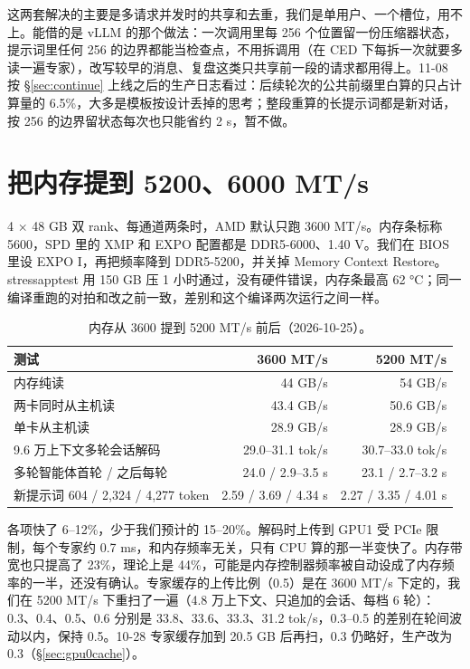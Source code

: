 \documentclass[11pt,a4paper]{article}
\newcommand{\tps}{tok/s}
\begin{document}
这两套解决的主要是多请求并发时的共享和去重，我们是单用户、一个槽位，用不上。能借的是 vLLM 的那个做法：一次调用里每 256 个位置留一份压缩器状态，提示词里任何 256 的边界都能当检查点，不用拆调用（在 CED 下每拆一次就要多读一遍专家），改写较早的消息、复盘这类只共享前一段的请求都用得上。11-08 按 \S\ref{sec:continue} 上线之后的生产日志看过：后续轮次的公共前缀里白算的只占计算量的 6.5\%，大多是模板按设计丢掉的思考；整段重算的长提示词都是新对话，按 256 的边界留状态每次也只能省约 2 s，暂不做。

\section{把内存提到 5200、6000 MT/s}
\label{sec:ddr}

4 × 48 GB 双 rank、每通道两条时，AMD 默认只跑 3600 MT/s。内存条标称 5600，SPD 里的 XMP 和 EXPO 配置都是 DDR5-6000、1.40 V。我们在 BIOS 里设 EXPO I，再把频率降到 DDR5-5200，并关掉 Memory Context Restore。stressapptest 用 150 GB 压 1 小时通过，没有硬件错误，内存条最高 62 °C；同一编译重跑的对拍和改之前一致，差别和这个编译两次运行之间一样。

\begin{table}[h]
  \centering
  \small
  \caption{内存从 3600 提到 5200 MT/s 前后（2026-10-25）。}
  \label{tab:ddr5200}
  \begin{tabular}{@{}l r r@{}}
    \toprule
    测试 & 3600 MT/s & 5200 MT/s \\
    \midrule
    内存纯读 & 44 GB/s & 54 GB/s \\
    两卡同时从主机读 & 43.4 GB/s & 50.6 GB/s \\
    单卡从主机读 & 28.9 GB/s & 28.9 GB/s \\
    9.6 万上下文多轮会话解码 & 29.0--31.1 \tps{} & 30.7--33.0 \tps{} \\
    多轮智能体首轮 / 之后每轮 & 24.0 / 2.9--3.5 s & 23.1 / 2.7--3.2 s \\
    新提示词 604 / 2,324 / 4,277 token & 2.59 / 3.69 / 4.34 s & 2.27 / 3.35 / 4.01 s \\
    \bottomrule
  \end{tabular}
\end{table}

各项快了 6--12\%，少于我们预计的 15--20\%。解码时上传到 GPU1 受 PCIe 限制，每个专家约 0.7 ms，和内存频率无关，只有 CPU 算的那一半变快了。内存带宽也只提高了 23\%，理论上是 44\%，可能是内存控制器频率被自动设成了内存频率的一半，还没有确认。专家缓存的上传比例（0.5）是在 3600 MT/s 下定的，我们在 5200 MT/s 下重扫了一遍（4.8 万上下文、只追加的会话、每档 6 轮）：0.3、0.4、0.5、0.6 分别是 33.8、33.6、33.3、31.2 \tps{}，0.3--0.5 的差别在轮间波动以内，保持 0.5。10-28 专家缓存加到 20.5 GB 后再扫，0.3 仍略好，生产改为 0.3（\S\ref{sec:gpu0cache}）。
\end{document}
